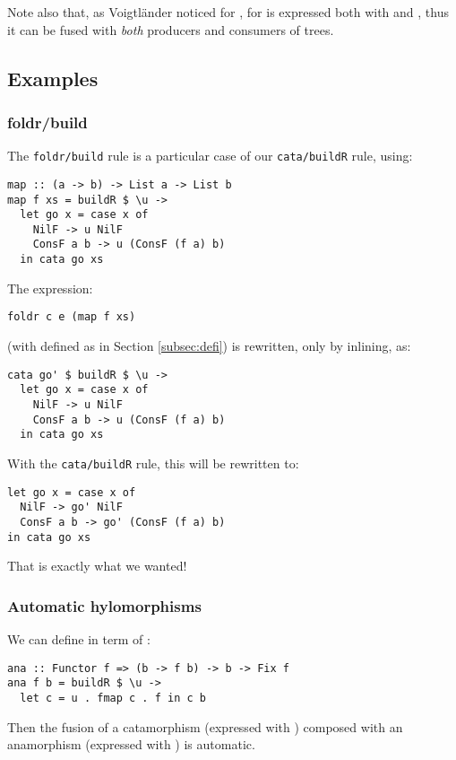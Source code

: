 Note also that, as Voigtländer \cite{Voigtlnder2008TypesFP} noticed for ,  for  is expressed both with  and , thus it can be fused with \emph{both} producers and consumers of trees.

\subsection{Examples}
\subsubsection{foldr/build}
The \verb|foldr/build| rule is a particular case of our \verb|cata/buildR| rule, using:
\begin{verbatim}
map :: (a -> b) -> List a -> List b
map f xs = buildR $ \u ->
  let go x = case x of
    NilF -> u NilF
    ConsF a b -> u (ConsF (f a) b)
  in cata go xs
\end{verbatim}

\noindent The expression:
\begin{verbatim}
foldr c e (map f xs)
\end{verbatim}
(with  defined as in Section    \ref{subsec:defi}) is rewritten, only by inlining, as:
\begin{verbatim}
cata go' $ buildR $ \u ->
  let go x = case x of
    NilF -> u NilF
    ConsF a b -> u (ConsF (f a) b)
  in cata go xs
\end{verbatim}

\noindent With the \verb|cata/buildR| rule, this will be rewritten to:
\begin{verbatim}
let go x = case x of
  NilF -> go' NilF
  ConsF a b -> go' (ConsF (f a) b)
in cata go xs
\end{verbatim}
That is exactly what we wanted!

\subsubsection{Automatic hylomorphisms}
We can define  in term of :
\begin{verbatim}
ana :: Functor f => (b -> f b) -> b -> Fix f
ana f b = buildR $ \u ->
  let c = u . fmap c . f in c b
\end{verbatim}

\noindent Then the fusion of a catamorphism (expressed with ) composed with an anamorphism (expressed with ) is automatic.

